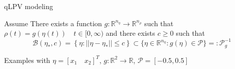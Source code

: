 \documentclass{beamer}
\begin{document}
\begin{frame}{qLPV modeling}
\begin{block}{Assume}
There exists a function $g:\mathbb{R}^{n_{\eta}}\rightarrow\mathbb{R}^{n_{\rho}}$ such that $\rho(t)=g(\eta(t))\quad t\in[0,\infty)$ and there exists $c\geq 0$ such that 
\begin{equation*}
	\mathcal{B}(\eta_*,c)=\left\{ \eta:||\eta-\eta_*|| \leq c \right\} \subset \{\eta\in \mathbb{R}^{n_{\eta}}:g(\eta)\in \mathcal{P}\}=:\mathcal{P}^{-1}_g
\end{equation*}
\end{block}
\pause 
\begin{block}{Examples with $\eta=[x_1\quad x_2]^T$, $g:\mathbb{R}^2\rightarrow \mathbb{R}$, $\mathcal{P}=[-0.5,0.5]$}
\end{block}
\begin{figure}
	

\end{figure}
\end{frame}
\end{document}
